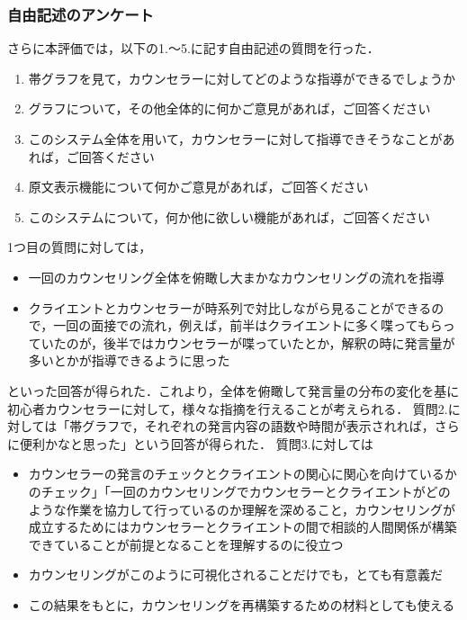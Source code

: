 \documentclass[shuuron]{kuee}
\begin{document}

\subsubsection{自由記述のアンケート}

さらに本評価では，以下の1.〜5.に記す自由記述の質問を行った．

\begin{enumerate}
  \item 帯グラフを見て，カウンセラーに対してどのような指導ができるでしょうか
  \item グラフについて，その他全体的に何かご意見があれば，ご回答ください
  \item このシステム全体を用いて，カウンセラーに対して指導できそうなことがあれば，ご回答ください
  \item 原文表示機能について何かご意見があれば，ご回答ください
  \item このシステムについて，何か他に欲しい機能があれば，ご回答ください
\end{enumerate}

1つ目の質問に対しては，
\begin{itemize}

  \item 一回のカウンセリング全体を俯瞰し大まかなカウンセリングの流れを指導
  \item クライエントとカウンセラーが時系列で対比しながら見ることができるので，一回の面接での流れ，例えば，前半はクライエントに多く喋ってもらっていたのが，後半ではカウンセラーが喋っていたとか，解釈の時に発言量が多いとかが指導できるように思った
\end{itemize}
といった回答が得られた．これより，全体を俯瞰して発言量の分布の変化を基に初心者カウンセラーに対して，様々な指摘を行えることが考えられる．
質問2.に対しては「帯グラフで，それぞれの発言内容の語数や時間が表示されれば，さらに便利かなと思った」という回答が得られた．
質問3.に対しては

\begin{itemize}

  \item カウンセラーの発言のチェックとクライエントの関心に関心を向けているかのチェック」「一回のカウンセリングでカウンセラーとクライエントがどのような作業を協力して行っているのか理解を深めること，カウンセリングが成立するためにはカウンセラーとクライエントの間で相談的人間関係が構築できていることが前提となることを理解するのに役立つ
  \item カウンセリングがこのように可視化されることだけでも，とても有意義だ
  \item この結果をもとに，カウンセリングを再構築するための材料としても使える
\end{itemize}
\end{document}
